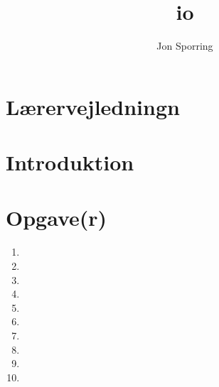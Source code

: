 \documentclass[a4paper,12pt]{article}
\title{io}
\author{Jon Sporring}
\begin{document}
\maketitle

\section{Lærervejledningn}

\section{Introduktion}

\section{Opgave(r)}
\begin{enumerate}
\item 
\item 
\item 
\item 
\item 
\item 
\item 
\item 
\item 
\item 
\end{enumerate}
\end{document}
